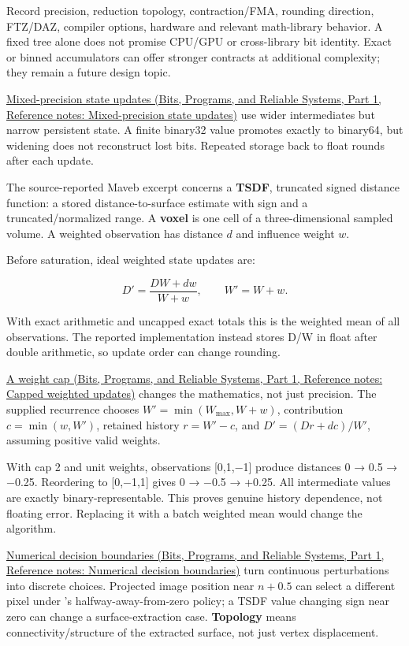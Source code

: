 Record precision, reduction topology, contraction/FMA, rounding direction, FTZ/DAZ, compiler options, hardware and relevant math-library behavior. A fixed tree alone does not promise CPU/GPU or cross-library bit identity. Exact or binned accumulators can offer stronger contracts at additional complexity; they remain a future design topic.

\href{../01-Bits-Programs-and-Reliable-Systems-P01/main.pdf\#appendix-260182e617b7}{Mixed-precision state updates (Bits, Programs, and Reliable Systems, Part 1, Reference notes: Mixed-precision state updates)} use wider intermediates but narrow persistent state. A finite binary32 value promotes exactly to binary64, but widening does not reconstruct lost bits. Repeated storage back to float rounds after each update.

The source-reported Maveb excerpt concerns a \textbf{TSDF}, truncated signed distance function: a stored distance-to-surface estimate with sign and a truncated/normalized range. A \textbf{voxel} is one cell of a three-dimensional sampled volume. A weighted observation has distance \(d\) and influence weight \(w\).

Before saturation, ideal weighted state updates are:

\[
D'=\frac{DW+dw}{W+w},\qquad W'=W+w.
\]

With exact arithmetic and uncapped exact totals this is the weighted mean of all observations. The reported implementation instead stores D/W in float after double arithmetic, so update order can change rounding.

\href{../01-Bits-Programs-and-Reliable-Systems-P01/main.pdf\#appendix-1e45d0613db3}{A weight cap (Bits, Programs, and Reliable Systems, Part 1, Reference notes: Capped weighted updates)} changes the mathematics, not just precision. The supplied recurrence chooses \(W'=\min(W_{\max},W+w)\), contribution \(c=\min(w,W')\), retained history \(r=W'-c\), and \(D'=(Dr+dc)/W'\), assuming positive valid weights.

With cap 2 and unit weights, observations {[}0,1,−1{]} produce distances 0 → 0.5 → −0.25. Reordering to {[}0,−1,1{]} gives 0 → −0.5 → +0.25. All intermediate values are exactly binary-representable. This proves genuine history dependence, not floating error. Replacing it with a batch weighted mean would change the algorithm.

\href{../01-Bits-Programs-and-Reliable-Systems-P01/main.pdf\#appendix-c80db39080be}{Numerical decision boundaries (Bits, Programs, and Reliable Systems, Part 1, Reference notes: Numerical decision boundaries)} turn continuous perturbations into discrete choices. Projected image position near \(n+0.5\) can select a different pixel under 's halfway-away-from-zero policy; a TSDF value changing sign near zero can change a surface-extraction case. \textbf{Topology} means connectivity/structure of the extracted surface, not just vertex displacement.

